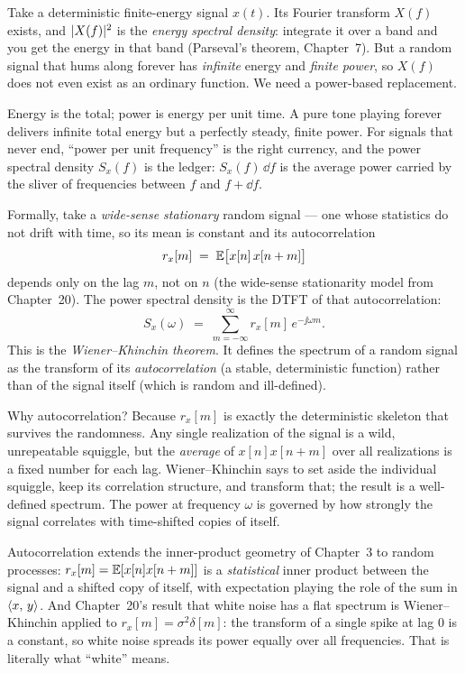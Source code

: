 Take a deterministic finite-energy signal $x(t)$. Its Fourier transform $X(f)$
exists, and $\lvert X(f)\rvert^2$ is the \emph{energy spectral density}: integrate it
over a band and you get the energy in that band (Parseval's theorem,
Chapter~7). But a random signal that hums along forever has
\emph{infinite} energy and \emph{finite power}, so $X(f)$ does not even exist as an
ordinary function. We need a power-based replacement.

\begin{intuitionbox}
Energy is the total; power is energy per unit time. A pure tone playing forever
delivers infinite total energy but a perfectly steady, finite power. For signals
that never end, ``power per unit frequency'' is the right currency, and the
power spectral density $S_x(f)$ is the ledger: $S_x(f)\,\dd f$ is the average power
carried by the sliver of frequencies between $f$ and $f+\dd f$.
\end{intuitionbox}

Formally, take a \emph{wide-sense stationary} random signal --- one whose
statistics do not drift with time, so its mean is constant and its
autocorrelation
\[
r_x[m] \;=\; \operatorname{\mathbb{E}}\!\big[x[n]\,x[n+m]\big]
\]
depends only on the lag $m$, not on $n$ (the wide-sense stationarity model from
Chapter~20). The power spectral density is the DTFT of that
autocorrelation:
\[
\boxed{\;S_x(\omega) \;=\; \sum_{m=-\infty}^{\infty} r_x[m]\, e^{-\jj \omega m}.\;}
\]
This is the \emph{Wiener--Khinchin theorem}. It defines the spectrum of a random
signal as the transform of its \emph{autocorrelation} (a stable, deterministic
function) rather than of the signal itself (which is random and ill-defined).

\begin{whybox}
Why autocorrelation? Because $r_x[m]$ is exactly the deterministic skeleton that
survives the randomness. Any single realization of the signal is a wild,
unrepeatable squiggle, but the \emph{average} of $x[n]x[n+m]$ over all
realizations is a fixed number for each lag. Wiener--Khinchin says to set aside
the individual squiggle, keep its correlation structure, and transform that; the
result is a well-defined spectrum. The power at frequency
$\omega$ is governed by how strongly the signal correlates with time-shifted copies
of itself.
\end{whybox}

\begin{connectionbox}
Autocorrelation extends the inner-product geometry of Chapter~3 to random processes:
$r_x[m] = \operatorname{\mathbb{E}}[x[n]x[n+m]]$ is a \emph{statistical} inner product between the
signal and a shifted copy of itself, with expectation playing the role of the sum
in $\langle x,\, y \rangle$. And Chapter~20's result that white noise has a flat
spectrum is Wiener--Khinchin applied to $r_x[m]=\sigma^2\delta[m]$: the
transform of a single spike at lag $0$ is a constant, so white noise spreads its
power equally over all frequencies. That is literally what ``white'' means.
\end{connectionbox}

